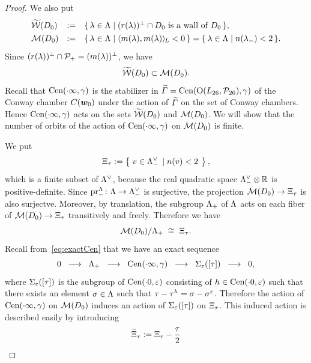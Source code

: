 \documentclass{amsart} %
\begin{document}
\begin{proof}
%
We also put 
\[
\renewcommand{\arraystretch}{1.3}
\begin{array}{lll}
\tilwalls(D_0) &:= & \set{\lambda\in \Leech}{\textrm{$(\LeechRoot{\lambda})\sperp \cap D_0$ is a wall of $D_0$}}, \\
\MMM(D_0) &:=& \set{\lambda\in \Leech}{\intfL{m(\lambda), m(\lambda)}<0}=\set{\lambda\in \Leech}{n(\lambdaminus)<2}.
\end{array}
\]
Since $(r(\lambda))^{\perp}\cap \mathord{\mathcal{P}}_{+}=(m(\lambda) )^{\perp}$,
we have 
%
\begin{equation}\label{eq:tilWWWMMM}
\widetilde{\mathord{\mathcal{W}}}(D_0)\subset \mathord{\mathcal{M}}(D_0).
\end{equation}
%
Recall that $\mathrm{Cen}(\cdot \infty, \gamma)$ is 
the stabilizer in $\widetilde{\varGamma}=\mathrm{Cen}(\mathord{\mathrm{O}}(L_{26}, \mathord{\mathcal{P}}_{26}), \gamma)$ of the Conway chamber $\mathord{C}(\boldsymbol{w}_0)$
under the action of $\widetilde{\varGamma}$ on the set of Conway chambers.
Hence $\mathrm{Cen}(\cdot \infty, \gamma)$
acts on the sets $\widetilde{\mathord{\mathcal{W}}}(D_0)$ and $\mathord{\mathcal{M}}(D_0) $.
We will show that the number of orbits of the action of $\mathrm{Cen}(\cdot \infty, \gamma)$ on $ \mathord{\mathcal{M}}(D_0)$
is finite.
\par
We put
%
\begin{equation}\label{eq:Xi}
\Xi_{\tau}:=\left\{\; {v\in \Lambda_{-}^{\vee} } \; \left\vert \; {n(v)<2} \; \right.\right \},
\end{equation}
%
which is a finite subset of $\Lambda^{\vee}$, because 
the real quadratic space 
$ \Lambda_{-}^{\vee}\otimes \mathord{\mathbb{R}}$ is positive-definite.
Since $\operatorname{pr}^{\Lambda}_{-}\colon \Lambda \to \Lambda_{-}^{\vee}$ is surjective,
the projection $\mathord{\mathcal{M}}(D_0) \to \Xi_{\tau}$ is also surjectve.
Moreover, by translation,
the subgroup $\Lambda_{+}$ of $\Lambda$ acts on each fiber of $\mathord{\mathcal{M}}(D_0) \to \Xi_{\tau}$ 
transitively and freely.
Therefore we have 
\[
\mathord{\mathcal{M}}(D_0)/\Lambda_{+} \;\cong \; \Xi_{\tau}. 
\]
Recall from~\eqref{eq:exactCen} that
we have an exact sequence
%
\begin{equation}\label{eq:exactCenagain}
0\;\;\longrightarrow\;\;\Lambda_{+}\;\; \longrightarrow \;\; 
\mathrm{Cen}(\cdot \infty, \gamma)
\;\; \longrightarrow \;\; 
\Sigma_{\varepsilon}([\tau])
\;\; \longrightarrow \;\; 0,
\end{equation}
%
where $\Sigma_{\varepsilon}([\tau])$ is the subgroup of $\mathrm{Cen}(\cdot 0, \varepsilon)$
consisting of $h\in \mathrm{Cen}(\cdot 0, \varepsilon)$ such that 
there exists an element $\sigma\in \Lambda$ such that $\tau-\tau^h=\sigma-\sigma^{\varepsilon}$.
Therefore the action 
of $\mathrm{Cen}(\cdot \infty, \gamma)$ on $\mathord{\mathcal{M}}(D_0)$ induces an action of 
$\Sigma_{\varepsilon}([\tau])$ on $\Xi_{\tau}$. 
This induced action is described easily by introducing 
%
\begin{equation}\label{eq:tilXi}
\tilXitau:=\Xitau -\dfrac{\tau}{2}

\end{equation}
\end{proof}
\end{document}
